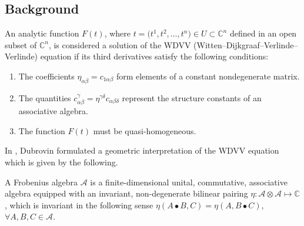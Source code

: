 \subsection{Background}

\begin{Definition}
An analytic function $F(t)$, where $t = \bigl(t^1, t^2, \dots, t^n\bigr) \in U \subset \mathbb{C}^n$ defined in an open subset of $\mathbb{C}^n$, is considered a solution of the WDVV (Witten--Dijkgraaf--Verlinde--Verlinde) equation if its third derivatives
satisfy the following conditions:
\begin{enumerate}\itemsep=0pt
\item[(1)] The coefficients $\eta_{\alpha\beta} = c_{1\alpha\beta}$ form elements of a constant nondegenerate matrix.
\item[(2)] The quantities $c_{\alpha\beta}^{\gamma} = \eta^{\gamma\delta} c_{\alpha\beta\delta}$ represent the structure constants of an associative algebra.
\item[(3)] The function $F(t)$ must be quasi-homogeneous.
\end{enumerate}
\end{Definition}


In \cite[Chapter~1]{B.Dubrovin2}, Dubrovin formulated a geometric interpretation of the WDVV equation which is given by the following.

\begin{Definition}
A Frobenius algebra $\mathcal{A}$ is a finite-dimensional unital, commutative, associative algebra equipped with an invariant, non-degenerate bilinear pairing
$
\eta \colon \mathcal{A} \otimes \mathcal{A} \mapsto \mathbb{C}$,
which is invariant in the following sense
$
\eta(A \bullet B, C) = \eta(A, B \bullet C)$, $ \forall A, B, C \in \mathcal{A}$.
\end{Definition}

